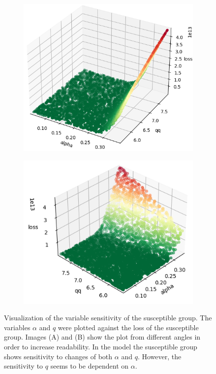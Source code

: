 \begin{figure}[h]
	\centering
	\begin{subfigure}[b]{0.4\textwidth}
		\centering
		\includegraphics[width=\textwidth]{./figures/sensitivity/sensitivity_zoom0_0_2.png}	
		\caption{}
	\end{subfigure}
	\begin{subfigure}[b]{0.4\textwidth}
		\centering
		\includegraphics[width=\textwidth]{./figures/sensitivity/sensitivity_zoom0_1_2.png}	
		\caption{}
	\end{subfigure}
	\caption{Visualization of the variable sensitivity of the susceptible group. The variables $\alpha$ and $q$ were plotted
		against the loss of the susceptible group. Images (A) and (B) show the plot from different angles in order
		to increase readability. In the model the susceptible group shows sensitivity to changes of both $\alpha$ and
		$q$. However, the sensitivity to $q$ seems to be dependent on $\alpha$.
		}
	\label{fig:sensitivity_zoom0}
\end{figure}

